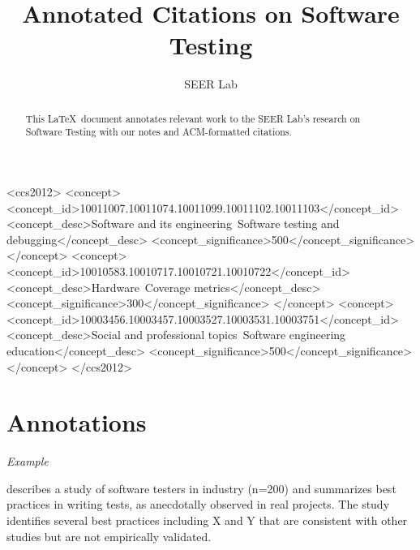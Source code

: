 \documentclass[10pt,sigconf]{acmart}
\begin{document}
\title{Annotated Citations on Software Testing}

\author{SEER Lab}


\begin{abstract}
This \LaTeX\ document annotates relevant work to the SEER Lab's research on
Software Testing with our notes and ACM-formatted citations.
\end{abstract}

%
%
\begin{CCSXML}
<ccs2012>
   <concept>
       <concept_id>10011007.10011074.10011099.10011102.10011103</concept_id>
       <concept_desc>Software and its engineering~Software testing and debugging</concept_desc>
       <concept_significance>500</concept_significance>
       </concept>
   <concept>
       <concept_id>10010583.10010717.10010721.10010722</concept_id>
       <concept_desc>Hardware~Coverage metrics</concept_desc>
       <concept_significance>300</concept_significance>
       </concept>
   <concept>
       <concept_id>10003456.10003457.10003527.10003531.10003751</concept_id>
       <concept_desc>Social and professional topics~Software engineering education</concept_desc>
       <concept_significance>500</concept_significance>
       </concept>
 </ccs2012>
\end{CCSXML}




\maketitle

\section{Annotations}

\textit{Example}

\cite{lastname-year} describes a study of software testers in industry (n=200)
and summarizes best practices in writing tests, as anecdotally observed in real
projects. The study identifies several best practices including X and Y that are
consistent with other studies \cite{abc} \cite{xyz} but are not empirically
validated.



\end{document}
